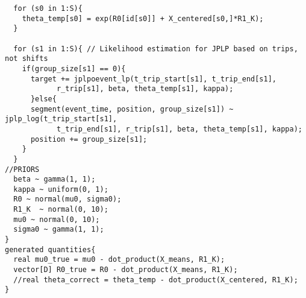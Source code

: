 \documentclass[
]{article}
\begin{document}
\begin{verbatim}
  for (s0 in 1:S){
    theta_temp[s0] = exp(R0[id[s0]] + X_centered[s0,]*R1_K);
  }

  for (s1 in 1:S){ // Likelihood estimation for JPLP based on trips, not shifts
    if(group_size[s1] == 0){
      target += jplpoevent_lp(t_trip_start[s1], t_trip_end[s1], 
            r_trip[s1], beta, theta_temp[s1], kappa);
      }else{
      segment(event_time, position, group_size[s1]) ~ jplp_log(t_trip_start[s1], 
            t_trip_end[s1], r_trip[s1], beta, theta_temp[s1], kappa);
      position += group_size[s1];
    }
  }
//PRIORS
  beta ~ gamma(1, 1);
  kappa ~ uniform(0, 1);
  R0 ~ normal(mu0, sigma0);
  R1_K  ~ normal(0, 10);
  mu0 ~ normal(0, 10);
  sigma0 ~ gamma(1, 1);
}
generated quantities{
  real mu0_true = mu0 - dot_product(X_means, R1_K);
  vector[D] R0_true = R0 - dot_product(X_means, R1_K);
  //real theta_correct = theta_temp - dot_product(X_centered, R1_K);
}
\end{verbatim}
\end{document}
